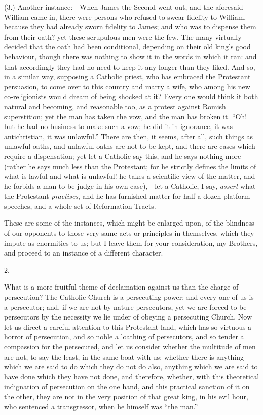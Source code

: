 (3.) Another instance:—When James the Second went
out, and the aforesaid William came in, there were
persons who refused to swear fidelity to William, because
they had already sworn fidelity to James; and who was to
dispense them from their oath? yet these scrupulous men
were the few. The many virtually decided that the oath
had been conditional, depending on their old king's good
behaviour, though there was nothing to show it in the
words in which it ran: and that accordingly they had no
need to keep it any longer than they liked. And so, in a
similar way, supposing a Catholic priest, who has
embraced the Protestant persuasion, to come over to this
country and marry a wife, who among his new
co-religionists would dream of being shocked at it? Every
one would think it both natural and becoming, and
reasonable too, as a protest against Romish superstition;
yet the man has taken the vow, and the man has broken it.
``Oh! but he had no business to make such a vow; he
did it in ignorance, it was antichristian, it was
unlawful.'' There are then, it seems, after all, such
things as unlawful oaths, and unlawful oaths are not to
be kept, and there are cases which require a
dispensation; yet let a Catholic say this, and he says
nothing more—(rather he says much less than the
Protestant; for he strictly defines the limits of what is
lawful and what is unlawful! he takes a scientific view
of the matter, and he forbids a man to be judge in his
own case),—let a Catholic, I say, \emph{assert} what the
Protestant \emph{practises}, and he has furnished matter for
half-a-dozen platform speeches, and a whole set of
Reformation Tracts.

These are some of the instances, which might be
enlarged upon, of the blindness of our opponents to those
very same acts or principles in themselves, which they
impute as enormities to us; but I leave them for your
consideration, my Brothers, and proceed to an instance of
a different character.

2.

What is a more fruitful theme of declamation against
us than the charge of persecution? The Catholic Church is
a persecuting power; and every one of us is a persecutor;
and, if we are not by nature persecutors, yet we are
forced to be persecutors by the necessity we lie under of
obeying a persecuting Church. Now let us direct a careful
attention to this Protestant land, which has so virtuous
a horror of persecution, and so noble a loathing of
persecutors, and so tender a compassion for the
persecuted, and let us consider whether the multitude of
men are not, to say the least, in the same boat with us;
whether there is anything which we are said to do which
they do not do also, anything which we are said to have
done which they have not done, and therefore, whether,
with this theoretical indignation of persecution on the
one hand, and this practical sanction of it on the other,
they are not in the very position of that great king, in
his evil hour, who sentenced a transgressor, when he
himself was ``the man.''

